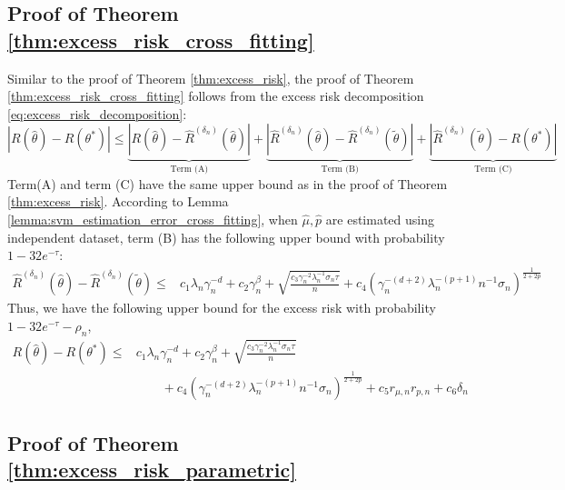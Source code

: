 \subsection{Proof of Theorem \ref{thm:excess_risk_cross_fitting}}

Similar to the proof of Theorem \ref{thm:excess_risk}, the proof of Theorem \ref{thm:excess_risk_cross_fitting} follows from the excess risk decomposition \eqref{eq:excess_risk_decomposition}:
$$ |R(\widehat\theta)-R\left(\theta^*\right)|\leq \underbrace{|R(\widehat\theta)-\widehat R^{({\delta_n})}(\widehat\theta)|}_{\text{Term (A)}} + \underbrace{|\widehat R^{({\delta_n})}(\widehat\theta) - \widehat R^{({\delta_n})}(\tilde\theta)|}_{\text{Term (B)}} + \underbrace{|\widehat R^{({\delta_n})}(\tilde\theta) - R(\theta^*)|}_{\text{Term (C)}} $$
Term(A) and term (C) have the same upper bound as in the proof of Theorem \ref{thm:excess_risk}. According to Lemma \ref{lemma:svm_estimation_error_cross_fitting}, when $\hat\mu,\hat p$ are estimated using independent dataset, term (B) has the following upper bound with probability $1-32e^{-\tau}$:
\begin{align*}
  \widehat R^{({\delta_n})}(\widehat\theta) - \widehat R^{({\delta_n})}(\tilde\theta)\leq & c_1 \lambda_n\gamma_n^{-d} + c_2\gamma_n^{\beta}+ \sqrt{\frac{ c_3\gamma_n^{-2}\lambda_n^{-1}\sigma_n\tau}{n}} + c_4\left(\gamma_n^{-(d+2)}\lambda_n^{-(p+1)}n^{-1}\sigma_n\right)^{\frac{1}{2+2p}} 
\end{align*}
Thus, we have the following upper bound for the excess risk with probability $1-32e^{-\tau} - \rho_n$,
\begin{align*}
       R(\widehat\theta)-R\left(\theta^*\right)\leq & c_1 \lambda_n\gamma_n^{-d} + c_2\gamma_n^{\beta}+ \sqrt{\frac{ c_3\gamma_n^{-2}\lambda_n^{-1}\sigma_n\tau}{n}}   \\
   & \qquad + c_4\left(\gamma_n^{-(d+2)}\lambda_n^{-(p+1)}n^{-1}\sigma_n\right)^{\frac{1}{2+2p}} + c_5r_{\mu,n}r_{p,n}  + c_6{\delta_n}
    \end{align*}

\subsection{Proof of Theorem \ref{thm:excess_risk_parametric}}

